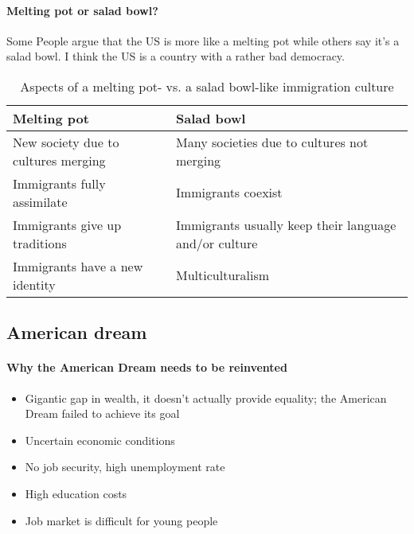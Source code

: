 \documentclass[10pt]{article}
\begin{document}
\paragraph{Melting pot or salad bowl?} Some People argue that the US is more like a melting pot while others say it's a salad bowl.
I think the US is a country with a rather bad democracy.
\begin{table}[htbp]
	\centering
	\begin{tabularx}{\textwidth}{X X}
		\hline
		{\sffamily\bfseries Melting pot} & {\sffamily\bfseries Salad bowl} \\ \hline
		New society due to cultures merging & Many societies due to cultures not merging \\
		Immigrants fully assimilate & Immigrants coexist \\
		Immigrants give up traditions & Immigrants usually keep their language and/or culture \\
		Immigrants have a new identity & Multiculturalism \\ \hline
	\end{tabularx}
	\caption{Aspects of a melting pot- vs. a salad bowl-like immigration culture}
	\label{tab:usa/immig/meltingpot}
\end{table}
\newpage
\subsection{American dream}
	\label{sec:usa/dream}
\paragraph{Why the American Dream needs to be reinvented}
\begin{itemize}
\item Gigantic gap in wealth, it doesn’t actually provide equality; the American Dream failed to achieve its goal
\item Uncertain economic conditions
\item No job security, high unemployment rate
\item High education costs
\item Job market is difficult for young people
\end{itemize}
\end{document}

